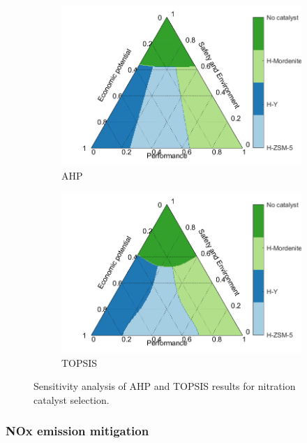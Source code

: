 \begin{figure}[h]
    \centering
    \begin{subfigure}{0.49\linewidth}
        \includegraphics[width=\linewidth]{chapters/1-synthesis/1-Figures/AHP_nitration.pdf}
        \caption{AHP}
    \end{subfigure}
    \begin{subfigure}{0.49\linewidth}
        \includegraphics[width=\linewidth]{chapters/1-synthesis/1-Figures/TOPSIS_nitration.pdf}
        \caption{TOPSIS}
    \end{subfigure}
    \caption{Sensitivity analysis of AHP and TOPSIS results for nitration catalyst selection.}%
    \label{fig:catalyst}%
\end{figure}

\subsubsection{NOx emission mitigation}
\label{sec:NOx}

